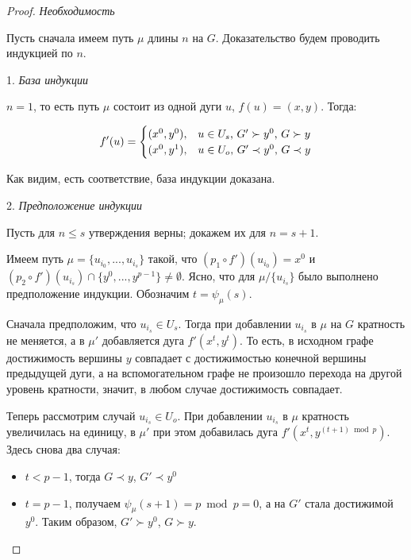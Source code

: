 \begin{proof}
	
	\textit {Необходимость}
	
	Пусть сначала имеем путь $\mu$ длины $n$ на $G$. Доказательство будем проводить индукцией по $n$.
	
	1. \textit {База индукции}
	
	$n = 1$, то есть путь $\mu$ состоит из одной дуги $u$, $f(u) = (x, y)$. Тогда:
	
	\begin{equation*}
	f'(u) = 
	\begin{cases}
	(x^0, y^0), &\text{$ u \in U_s$, $G' \succ y^0$, $G \succ y$}\\
	(x^0, y^1), &\text{$ u \in U_o$, $G' \prec y^0$, $G \prec y$}
	\end{cases}
	\end{equation*} 
	
	Как видим, есть соответствие, база индукции доказана.
	
	2. \textit {Предположение индукции}
	
	Пусть для $ n \leq s$ утверждения верны; докажем их для $ n = s + 1$.
	
	Имеем путь $\mu = \{u_{i_0}, ... , u_{i_s}\}$ такой, что $(p_1 \circ f')(u_{i_0}) = x^0$ и $(p_2 \circ f')(u_{i_s}) \cap \{y^0, ... , y^{p-1}\} \neq \emptyset$. Ясно, что для $\mu / \{u_{i_s}\}$ было выполнено предположение индукции. Обозначим $t = \psi_\mu(s)$.
	
	Сначала предположим, что $u_{i_s} \in U_s$. Тогда при добавлении $u_{i_s}$ в $\mu$ на $G$ кратность не меняется, а в $\mu'$ добавляется дуга $f'(x^t, y^t)$. То есть, в исходном графе достижимость вершины $y$ совпадает с достижимостью конечной вершины предыдущей дуги, а на вспомогательном графе не произошло перехода на другой уровень кратности, значит, в любом случае достижимость совпадает. 
	
	Теперь рассмотрим случай $u_{i_s} \in U_o$. При добавлении $u_{i_s}$ в $\mu$ кратность увеличилась на единицу, в $\mu'$ при этом добавилась дуга $f'(x^t, y^{(t+1) \bmod p})$. Здесь снова два случая:
	
	\begin{itemize}
		\item $t < p - 1$, тогда  $G \prec y$, $G' \prec y^0$
		\item $t = p - 1$, получаем $\psi_\mu(s+1) = p\bmod p = 0$, а на $G'$ стала достижимой $y^0$. Таким образом, $G' \succ y^0$, $G \succ y$.
	\end{itemize}
	

\end{proof}
